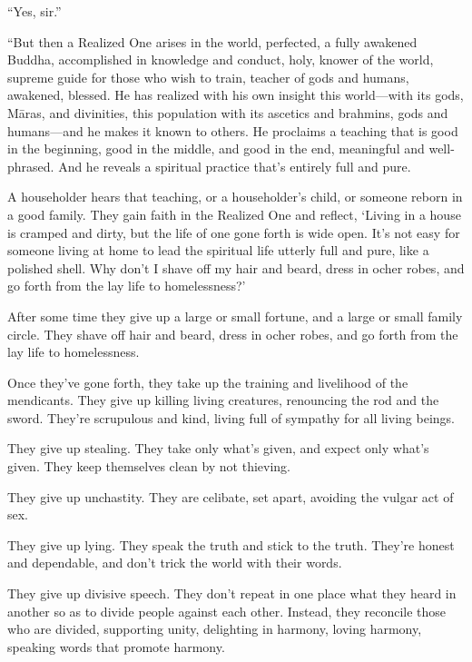 \documentclass[12pt,openany]{book}%
\begin{document}
“Yes, sir.” 

“But then a Realized One arises in the world, perfected, a fully awakened Buddha, accomplished in knowledge and conduct, holy, knower of the world, supreme guide for those who wish to train, teacher of gods and humans, awakened, blessed. He has realized with his own insight this world—with its gods, \textsanskrit{Māras}, and divinities, this population with its ascetics and brahmins, gods and humans—and he makes it known to others. He proclaims a teaching that is good in the beginning, good in the middle, and good in the end, meaningful and well-phrased. And he reveals a spiritual practice that’s entirely full and pure. 

A householder hears that teaching, or a householder’s child, or someone reborn in a good family. They gain faith in the Realized One and reflect, ‘Living in a house is cramped and dirty, but the life of one gone forth is wide open. It’s not easy for someone living at home to lead the spiritual life utterly full and pure, like a polished shell. Why don’t I shave off my hair and beard, dress in ocher robes, and go forth from the lay life to homelessness?’ 

After some time they give up a large or small fortune, and a large or small family circle. They shave off hair and beard, dress in ocher robes, and go forth from the lay life to homelessness. 

Once they’ve gone forth, they take up the training and livelihood of the mendicants. They give up killing living creatures, renouncing the rod and the sword. They’re scrupulous and kind, living full of sympathy for all living beings. 

They give up stealing. They take only what’s given, and expect only what’s given. They keep themselves clean by not thieving. 

They give up unchastity. They are celibate, set apart, avoiding the vulgar act of sex. 

They give up lying. They speak the truth and stick to the truth. They’re honest and dependable, and don’t trick the world with their words. 

They give up divisive speech. They don’t repeat in one place what they heard in another so as to divide people against each other. Instead, they reconcile those who are divided, supporting unity, delighting in harmony, loving harmony, speaking words that promote harmony. 
\end{document}
